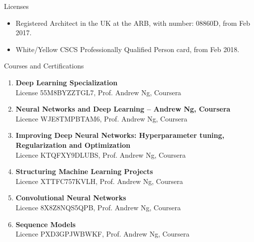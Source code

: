 \documentclass{resume}
\begin{document}
\begin{rSection}{Licenses}
    \begin{itemize}[leftmargin=0.45cm, itemsep=0em, topsep=0.5em, parsep=0.2em]
        \item Registered Architect in the UK at the ARB, with number: 08860D, from Feb 2017.
        \item White/Yellow CSCS Professionally Qualified Person card, from Feb 2018.
    \end{itemize}
\end{rSection}

\begin{rSection}{Courses and Certifications}
    \begin{enumerate}[leftmargin=0.45cm, itemsep=0em, topsep=0.5em, parsep=0.2em]
        \item \textbf{Deep Learning Specialization}\\
        License 55M8BYZZTGL7, Prof. Andrew Ng, Coursera
        \item \textbf{Neural Networks and Deep Learning – Andrew Ng, Coursera}\\
        Licence WJE8TMPBTAM6, Prof. Andrew Ng, Coursera
        \item \textbf{Improving Deep Neural Networks: Hyperparameter tuning, Regularization and Optimization} \\
        Licence KTQFXY9DLUBS, Prof. Andrew Ng, Coursera
        \item \textbf{Structuring Machine Learning Projects} \\
        Licence XTTFC757KVLH, Prof. Andrew Ng, Coursera
        \item \textbf{Convolutional Neural Networks}\\
        Licence 8X8Z8NQS5QPB, Prof. Andrew Ng, Coursera
        \item \textbf{Sequence Models}\\
        Licence PXD3GPJWBWKF, Prof. Andrew Ng, Coursera

    \end{enumerate}
\end{rSection}
\end{document}
